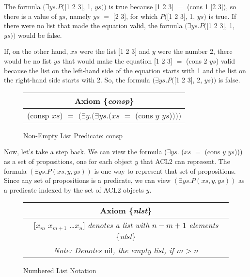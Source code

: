 The formula
$(\exists ys.P($\textsf{[1 2 3]}, \textsf{1}, $ys))$ is true
because \textsf{[1 2 3]} $=$ \textsf{(cons 1 [2 3])},
so there is a value of $ys$, namely $ys$ $=$ \textsf{[2 3]},
for which $P($\textsf{[1 2 3]}, \textsf{1}, $ys)$ is true.
If there were no list that made the equation valid,
the formula $(\exists ys.P($[1 2 3], \textsf{1}, $ys))$
would be false.

If, on the other hand, $xs$ were the list \textsf{[1 2 3]}
and $y$ were the number 2, there would be no list
$ys$ that would make the equation \textsf{[1 2 3]} $=$ \textsf{(cons $2$ $ys$)} valid
because the list on the left-hand side of the equation
starts with 1 and the list on the right-hand side starts with 2.
So, the formula $(\exists ys.P($\textsf{[1 2 3]}, \textsf{2}, $ys))$
is false.

\begin{figure}
\begin{tabular}{c}
Axiom \{\emph{consp}\} \\
\hline
\textsf{(consp $xs$)} $=$  $(\exists y.(\exists ys.(xs$ $=$ \textsf{(cons $y$ $ys$)}$)))$
\end{tabular}
\caption{Non-Empty List Predicate: consp}
\label{consp-axiom}
\end{figure}

Now, let's take a step back.
We can view the formula
($\exists ys.$ ($xs$ $=$ \textsf{(cons $y$ $ys$)}))
as a set of propositions,
one for each object $y$ that ACL2 can represent.
The formula
$(\exists ys.P(xs, y, ys))$ is one way to represent that
set of propositions.
Since any set of propositions is a predicate,
we can view $(\exists ys.P(xs, y, ys))$ as a predicate indexed
by the set of ACL2 objects $y$.

\begin{figure}
\begin{tabular}{c}
Axiom \{\emph{nlst}\}\\
\hline
\textsf{[$x_{m}$  $x_{m+1}$ \dots $x_{n}$]}  \emph{denotes a list with $n - m + 1$ elements} \{\emph{nlst}\} \\
\emph{Note: Denotes} \textsf{nil}\emph{, the empty list, if $m > n$}\\
\end{tabular}
\caption{Numbered List Notation}
\label{numbered-list-interpretation}
\end{figure}

